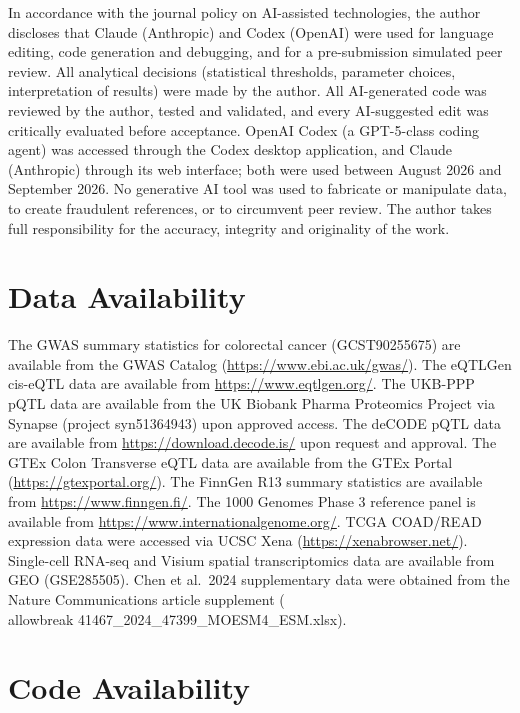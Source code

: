 \documentclass[11pt,a4paper]{article}
\begin{document}
In accordance with the journal policy on AI-assisted technologies, the author
discloses that Claude (Anthropic) and Codex (OpenAI) were used for language
editing, code generation and debugging, and for a pre-submission simulated peer
review. All analytical decisions (statistical thresholds, parameter choices,
interpretation of results) were made by the author. All AI-generated code was
reviewed by the author, tested and validated, and every AI-suggested edit was
critically evaluated before acceptance. OpenAI Codex (a GPT-5-class coding agent) was accessed through the Codex desktop application, and Claude (Anthropic) through its web interface; both were used between August 2026 and September 2026. No generative AI tool was used to
fabricate or manipulate data, to create fraudulent references, or to circumvent
peer review. The author takes full responsibility for the accuracy, integrity
and originality of the work.
\section*{Data Availability}

The GWAS summary statistics for colorectal cancer (GCST90255675) are available
from the GWAS Catalog (\url{https://www.ebi.ac.uk/gwas/}). The eQTLGen
cis-eQTL data are available from \url{https://www.eqtlgen.org/}. The UKB-PPP
pQTL data are available from the UK Biobank Pharma Proteomics Project via
Synapse (project syn51364943) upon approved access. The deCODE pQTL data are
available from \url{https://download.decode.is/} upon request and approval.
The GTEx Colon Transverse eQTL data are available from the GTEx Portal
(\url{https://gtexportal.org/}). The FinnGen R13 summary statistics are
available from \url{https://www.finngen.fi/}. The 1000 Genomes Phase 3
reference panel is available from
\url{https://www.internationalgenome.org/}. TCGA COAD/READ expression data
were accessed via UCSC Xena (\url{https://xenabrowser.net/}). Single-cell
RNA-seq and Visium spatial transcriptomics data are available from GEO
(GSE285505). Chen et al.~2024 supplementary data were obtained from the
Nature Communications article supplement (\\allowbreak 41467\_2024\_47399\_MOESM4\_ESM.xlsx).

\section*{Code Availability}
\end{document}
